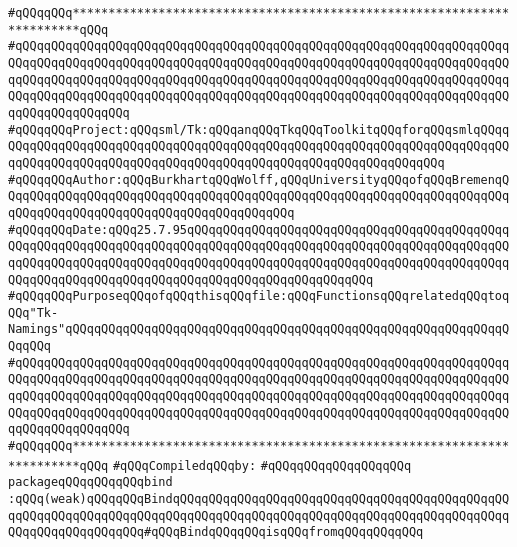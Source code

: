 \label{src/lib/tk/src/bind.pkg}
\verb|#qQQqqQQq***********************************************************************qQQq|\newline
\verb|#qQQqqQQqqQQqqQQqqQQqqQQqqQQqqQQqqQQqqQQqqQQqqQQqqQQqqQQqqQQqqQQqqQQqqQQqqQQqqQQqqQQqqQQqqQQqqQQqqQQqqQQqqQQqqQQqqQQqqQQqqQQqqQQqqQQqqQQqqQQqqQQqqQQqqQQqqQQqqQQqqQQqqQQqqQQqqQQqqQQqqQQqqQQqqQQqqQQqqQQqqQQqqQQqqQQqqQQqqQQqqQQqqQQqqQQqqQQqqQQqqQQqqQQqqQQqqQQqqQQqqQQqqQQqqQQqqQQqqQQqqQQqqQQqqQQqqQQq|\newline
\verb|#qQQqqQQqProject:qQQqsml/Tk:qQQqanqQQqTkqQQqToolkitqQQqforqQQqsmlqQQqqQQqqQQqqQQqqQQqqQQqqQQqqQQqqQQqqQQqqQQqqQQqqQQqqQQqqQQqqQQqqQQqqQQqqQQqqQQqqQQqqQQqqQQqqQQqqQQqqQQqqQQqqQQqqQQqqQQqqQQqqQQqqQQqqQQq|\newline
\verb|#qQQqqQQqAuthor:qQQqBurkhartqQQqWolff,qQQqUniversityqQQqofqQQqBremenqQQqqQQqqQQqqQQqqQQqqQQqqQQqqQQqqQQqqQQqqQQqqQQqqQQqqQQqqQQqqQQqqQQqqQQqqQQqqQQqqQQqqQQqqQQqqQQqqQQqqQQqqQQqqQQq|\newline
\verb|#qQQqqQQqDate:qQQq25.7.95qQQqqQQqqQQqqQQqqQQqqQQqqQQqqQQqqQQqqQQqqQQqqQQqqQQqqQQqqQQqqQQqqQQqqQQqqQQqqQQqqQQqqQQqqQQqqQQqqQQqqQQqqQQqqQQqqQQqqQQqqQQqqQQqqQQqqQQqqQQqqQQqqQQqqQQqqQQqqQQqqQQqqQQqqQQqqQQqqQQqqQQqqQQqqQQqqQQqqQQqqQQqqQQqqQQqqQQqqQQqqQQqqQQqqQQqqQQq|\newline
\verb|#qQQqqQQqPurposeqQQqofqQQqthisqQQqfile:qQQqFunctionsqQQqrelatedqQQqtoqQQq"Tk-Namings"qQQqqQQqqQQqqQQqqQQqqQQqqQQqqQQqqQQqqQQqqQQqqQQqqQQqqQQqqQQqqQQqqQQq|\newline
\verb|#qQQqqQQqqQQqqQQqqQQqqQQqqQQqqQQqqQQqqQQqqQQqqQQqqQQqqQQqqQQqqQQqqQQqqQQqqQQqqQQqqQQqqQQqqQQqqQQqqQQqqQQqqQQqqQQqqQQqqQQqqQQqqQQqqQQqqQQqqQQqqQQqqQQqqQQqqQQqqQQqqQQqqQQqqQQqqQQqqQQqqQQqqQQqqQQqqQQqqQQqqQQqqQQqqQQqqQQqqQQqqQQqqQQqqQQqqQQqqQQqqQQqqQQqqQQqqQQqqQQqqQQqqQQqqQQqqQQqqQQqqQQqqQQqqQQqqQQq|\newline
\verb|#qQQqqQQq***********************************************************************qQQq|\newline
\newline
\verb|#qQQqCompiledqQQqby:|\newline
\verb|#qQQqqQQqqQQqqQQqqQQq|\newline
\newline
\verb|packageqQQqqQQqqQQqbind|\newline
\verb|:qQQq(weak)qQQqqQQqBindqQQqqQQqqQQqqQQqqQQqqQQqqQQqqQQqqQQqqQQqqQQqqQQqqQQqqQQqqQQqqQQqqQQqqQQqqQQqqQQqqQQqqQQqqQQqqQQqqQQqqQQqqQQqqQQqqQQqqQQqqQQqqQQqqQQqqQQq#qQQqBindqQQqqQQqisqQQqfromqQQqqQQqqQQq|\newline
